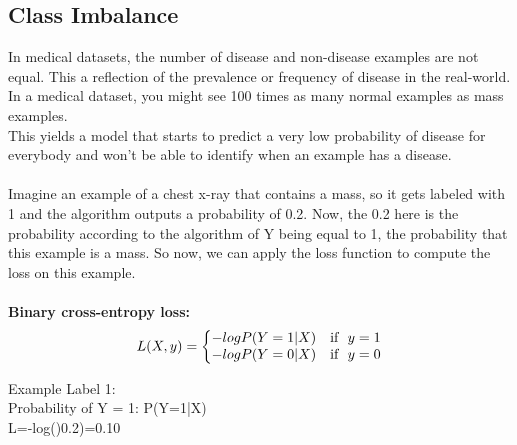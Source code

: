 \documentclass[a4paper,12pt]{article}
\begin{document}
\subsection{Class Imbalance}
In medical datasets, the number of disease and non-disease examples are not equal. This a reflection of the prevalence or frequency of disease in the real-world. In a medical dataset, you might see 100 times as many normal examples as mass examples.\\
This yields a model that starts to predict a very low probability of disease for everybody and won't be able to identify when an example has a disease.\\
\\
Imagine an example of a chest x-ray that contains a mass, so it gets labeled with 1 and the algorithm outputs a probability of 0.2. Now, the 0.2 here is the probability according to the algorithm of Y being equal to 1, the probability that this example is a mass. So now, we can apply the loss function to compute the loss on this example.
\\\\
\textbf{Binary cross-entropy loss:}
\begin{equation}
L(X,y)=\left\{
\begin{array}{@{}ll@{}}
-log P(Y=1|X) & \text{if}\ \ y=1 \nonumber \\
-log P(Y=0|X) & \text{if}\ \ y=0
\end{array}\right.
\end{equation} 

Example Label 1:\\
Probability of Y = 1: P(Y=1|X)\\
L=-log()0.2)=0.10\\
\end{document}
